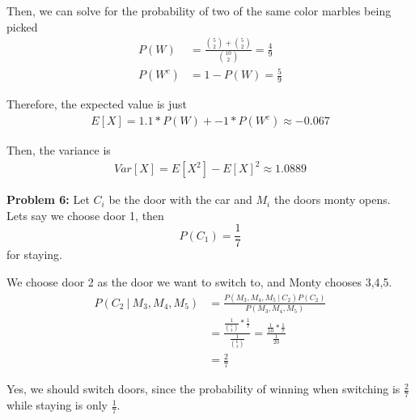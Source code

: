 \documentclass[12pt]{article}
\begin{document}
Then, we can solve for the probability of two of the same color marbles being picked
\begin{align*}
    P(W)   & = \frac{\binom{5}{2} + \binom{5}{2}}{\binom{10}{2}} = \frac{4}{9} \\
    P(W^c) & = 1 - P(W) = \frac{5}{9}
\end{align*}

Therefore, the expected value is just
\begin{align*}
    E[X] = 1.1 * P(W) + -1 * P(W^c) \approx{-0.067}
\end{align*}

Then, the variance is
\begin{align*}
    Var[X] = E[X^2] - E[X]^2 \approx{1.0889}
\end{align*}

\noindent \textbf{Problem 6:}
Let $C_i$ be the door with the car and $M_i$ the doors monty opens. Lets say we choose door 1, then
\[
    P(C_1) = \frac{1}{7}
\]
for staying.

We choose door 2 as the door we want to switch to, and Monty chooses 3,4,5.
\begin{align*}
    P(C_2 ~|~ M_3, M_4, M_5) & = \frac{P(M_3, M_4, M_5 ~|~ C_2) P(C_2)}{P(M_3, M_4, M_5)}                                                               \\
                             & = \frac{\frac{1}{\binom{5}{3}} * \frac{1}{7}}{\frac{1}{\binom{6}{3}}}  = \frac{\frac{1}{10} * \frac{1}{7}}{\frac{1}{20}} \\
                             & = \frac{2}{7}
\end{align*}

Yes, we should switch doors, since the probability of winning when switching is $\frac{2}{7}$ while staying is only $\frac{1}{7}$.
\end{document}

